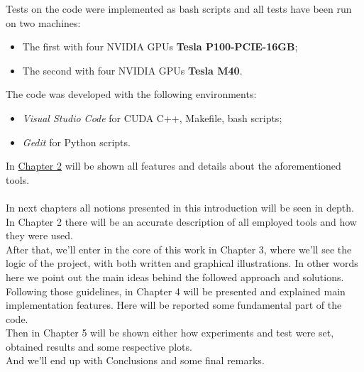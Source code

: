 		Tests on the code were implemented as bash scripts and all tests have been run on two machines:
		
		\begin{itemize}
			\item The first with four NVIDIA GPUs \textbf{Tesla P100-PCIE-16GB};
			
			\item The second with four NVIDIA GPUs \textbf{Tesla M40}.\\
		\end{itemize}
		
		The code was developed with the following environments:
		\begin{itemize}
			\item \textit{Visual Studio Code} for CUDA C++, Makefile, bash scripts;
			\item \textit{Gedit} for Python scripts.\\
		\end{itemize}
			
			
		In \hyperref[chap:tools]{Chapter 2} will be shown all features and details about the aforementioned tools.\\\\
	
In next chapters all notions presented in this introduction will be seen in depth.\\
In Chapter 2 there will be an accurate description of all employed tools and how they were used.\\
After that, we'll enter in the core of this work in Chapter 3, where we'll see the logic of the project, with both written and graphical illustrations. In other words here we point out the main ideas behind the followed approach and solutions.\\
Following those guidelines, in Chapter 4 will be presented and explained main implementation features. Here will be reported some fundamental part of the code.\\ 
Then in Chapter 5 will be shown either how experiments and test were set,  obtained results and some respective plots.\\
And we'll end up with Conclusions and some final remarks. 
